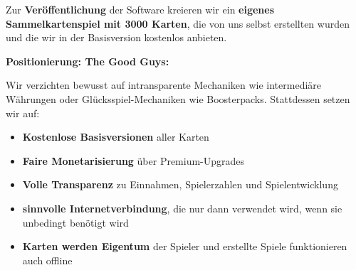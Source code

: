\documentclass[fontsize=12]{scrartcl}
\begin{document}
	\noindent Zur \textbf{Veröffentlichung} der Software kreieren wir ein \textbf{eigenes Sammelkartenspiel mit 3000 Karten}, die von uns selbst erstellten wurden und die wir in der Basisversion kostenlos anbieten.\hfill\newline
	
	\noindent \textbf{Positionierung: \glqq The Good Guys\grqq:}\hfill\newline
	
	\noindent Wir verzichten bewusst auf intransparente Mechaniken wie intermediäre Währungen oder Glücksspiel-Mechaniken wie Boosterpacks. Stattdessen setzen wir auf:
	
	\begin{itemize}
		
		\item \textbf{Kostenlose Basisversionen} aller Karten
		
		\item \textbf{Faire Monetarisierung} über Premium-Upgrades
		
		\item \textbf{Volle Transparenz} zu Einnahmen, Spielerzahlen und Spielentwicklung
		
		\item \textbf{sinnvolle Internetverbindung}, die nur dann verwendet wird, wenn sie unbedingt benötigt wird
		
		\item \textbf{Karten werden Eigentum} der Spieler und erstellte Spiele funktionieren auch offline 
		
	\end{itemize}
	
	
	
\end{document}

